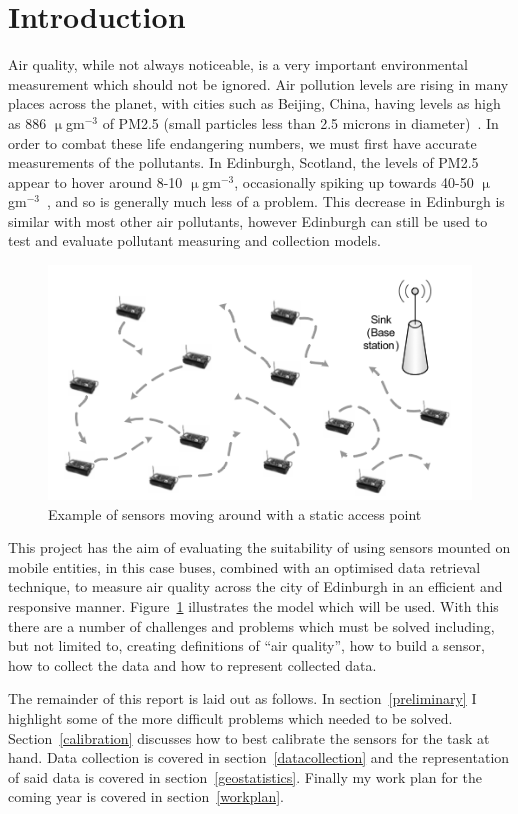 \section{Introduction}\label{intro}


Air quality, while not always noticeable, is a very important environmental measurement which should not be ignored. Air pollution levels are rising in many places across the planet, with cities such as Beijing, China, having levels as high as 886 $\upmu$gm$^{-3}$ of PM2.5 (small particles less than 2.5 microns in diameter)~\cite{beijinghightwitter}. In order to combat these life endangering numbers, we must first have accurate measurements of the pollutants. In Edinburgh, Scotland,  the levels of PM2.5 appear to hover around 8-10 $\upmu$gm$^{-3}$, occasionally spiking up towards 40-50 $\upmu$gm$^{-3}$~\cite{pm2point5inscotland}, and so is generally much less of a problem. This decrease in Edinburgh is similar with most other air pollutants, however Edinburgh can still be used to test and evaluate pollutant measuring and collection models. 

\begin{figure}[H]
    \begin{center}
        \includegraphics[scale=0.6]{./images/mpp1/BusModel.png}
        \caption{Example of sensors moving around with a static access point}
        \label{fig:busmodel}
    \end{center}
\end{figure}

This project has the aim of evaluating the suitability of using sensors mounted on mobile entities, in this case buses, combined with an optimised data retrieval technique, to measure air quality across the city of Edinburgh in an efficient and responsive manner. Figure~\ref{fig:busmodel} illustrates the model which will be used. With this there are a number of challenges and problems which must be solved including, but not limited to, creating definitions of ``air quality'', how to build a sensor, how to collect the data and how to represent collected data. 

The remainder of this report is laid out as follows. In section~\ref{preliminary} I highlight some of the more difficult problems which needed to be solved. Section~\ref{calibration} discusses how to best calibrate the sensors for the task at hand. Data collection is covered in section~\ref{datacollection} and the representation of said data is covered in section~\ref{geostatistics}. Finally my work plan for the coming year is covered in section~\ref{workplan}.

